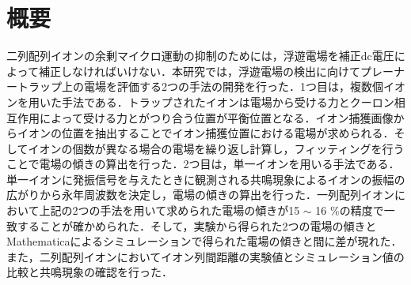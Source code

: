 \chapter{概要}
二列配列イオンの余剰マイクロ運動の抑制のためには，浮遊電場を補正dc電圧によって補正しなければいけない．本研究では，浮遊電場の検出に向けてプレーナートラップ上の電場を評価する2つの手法の開発を行った．1つ目は，複数個イオンを用いた手法である．トラップされたイオンは電場から受ける力とクーロン相互作用によって受ける力とがつり合う位置が平衡位置となる．イオン捕獲画像からイオンの位置を抽出することでイオン捕獲位置における電場が求められる．そしてイオンの個数が異なる場合の電場を繰り返し計算し，フィッティングを行うことで電場の傾きの算出を行った．2つ目は，単一イオンを用いる手法である．単一イオンに発振信号を与えたときに観測される共鳴現象によるイオンの振幅の広がりから永年周波数を決定し，電場の傾きの算出を行った．一列配列イオンにおいて上記の2つの手法を用いて求められた電場の傾きが15 $\sim$ 16 \%の精度で一致することが確かめられた．そして，実験から得られた2つの電場の傾きとMathematicaによるシミュレーションで得られた電場の傾きと間に差が現れた．また，二列配列イオンにおいてイオン列間距離の実験値とシミュレーション値の比較と共鳴現象の確認を行った．